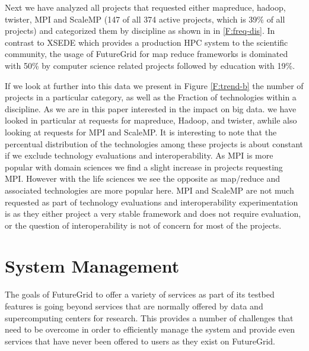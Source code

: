 \documentclass{article}
\newcommand{\FILE}[1]{}
\begin{document}
Next we have analyzed all projects that requested either mapreduce, hadoop, twister, MPI and ScaleMP (147 of all 374 active projects, which is 39\% of all projects) and categorized them by discipline as shown in in \ref{F:freq-dis}. In contrast to XSEDE which provides a production HPC system to the scientific community, the usage of FutureGrid for map reduce  frameworks is dominated with 50\% by computer science related projects followed by education with 19\%.


If we look at further into this data we present in Figure \ref{F:trend-b} the number of projects in a particular category, as well as the Fraction of technologies within a discipline. As we are in this paper interested in the impact on big data. we have looked in particular at requests for mapreduce, Hadoop, and twister, awhile also looking at requests for MPI and ScaleMP. It is interesting to note that the percentual distribution of the technologies among these projects is about constant if we exclude technology evaluations and interoperability. As MPI is more popular with domain sciences we find a slight increase in projects requesting MPI. However with the life sciences we see the opposite as map/reduce and associated technologies are more popular here. MPI and ScaleMP are not much requested as part of technology evaluations and interoperability experimentation is as they either project a very stable framework and does not require evaluation, or the question of interoperability is not of concern for most of the projects.  






\FILE{devops.tex}

\section{System Management}\label{S:devops}

The goals of FutureGrid to offer a variety of services as part of its testbed features is going beyond services that are normally offered by data and supercomputing centers for research. This provides a number of challenges that need to be overcome in order to efficiently manage the system and provide even services that have never been offered to users as they exist on FutureGrid.
\end{document}
